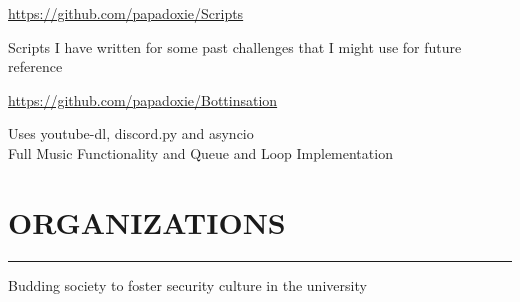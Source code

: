 \documentclass[]{resume}
\begin{document}
\hfill
\begin{minipage}[t]{0.66\textwidth}

    \vspace{-55.9pt}


     
    \href{https://github.com/papadoxie/Scripts}{https://github.com/papadoxie/Scripts}\\
    \vspace{4pt}
    \begin{minipage}{0.85\textwidth\vspace{2pt}}
        Scripts I have written for some past challenges that I might use for future reference
    \end{minipage}

    \vspace{8pt}
     
    \href{https://github.com/papadoxie/Bottinsation}{https://github.com/papadoxie/Bottinsation}\\
    \vspace{4pt}
    \begin{minipage}{0.85\textwidth\vspace{2pt}}
        Uses youtube-dl, discord.py and asyncio\\
        Full Music Functionality and Queue and Loop Implementation
    \end{minipage}


    \section{ORGANIZATIONS}
    \noindent\rule{12.80cm}{0.4pt}

     
    \vspace{4pt}
    \begin{minipage}{0.85\textwidth\vspace{4pt}}
        Budding society to foster security culture in the university\\
    \end{minipage}
    \noindent


\end{minipage}
\end{document}
